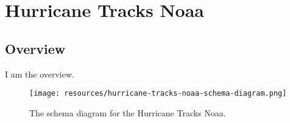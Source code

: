 \section{Hurricane Tracks Noaa}
\label{sec:hurricane-tracks-noaa}
\subsection{Overview}
\label{ssec:overview}

I am the overview.

\begin{figure}[h!]
  \begin{center}
    \texttt{[image: resources/hurricane-tracks-noaa-schema-diagram.png]}
  \end{center}
  \caption{The schema diagram for the Hurricane Tracks Noaa.}
  \label{fig:ov-diagram}
\end{figure}


